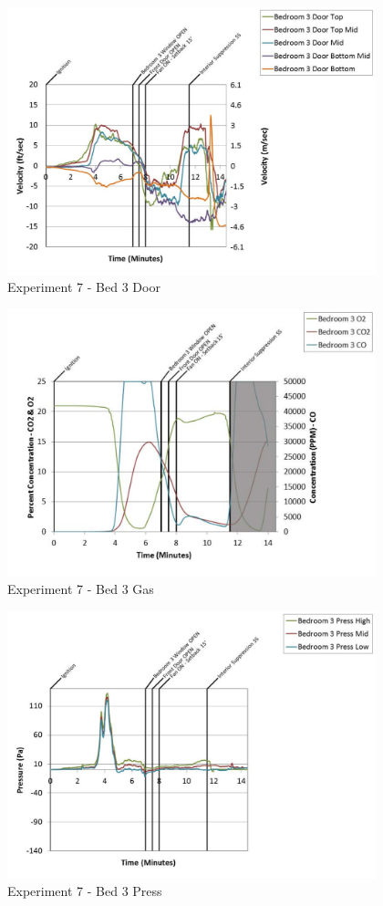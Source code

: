 \documentclass{article}
\begin{document}
\begin{appendices}
	\begin{figure}[h!]
		\centering
		\includegraphics[height=3.05in]{0_Images/Results_Charts/Exp_7_Charts/Bed3Door.pdf}
		\caption{Experiment 7 - Bed 3 Door}
	\end{figure}
 
	\clearpage

	\begin{figure}[h!]
		\centering
		\includegraphics[height=3.05in]{0_Images/Results_Charts/Exp_7_Charts/Bed3Gas.pdf}
		\caption{Experiment 7 - Bed 3 Gas}
	\end{figure}
 

	\begin{figure}[h!]
		\centering
		\includegraphics[height=3.05in]{0_Images/Results_Charts/Exp_7_Charts/Bed3Press.pdf}
		\caption{Experiment 7 - Bed 3 Press}
	\end{figure}
 

\end{appendices}
\end{document}
